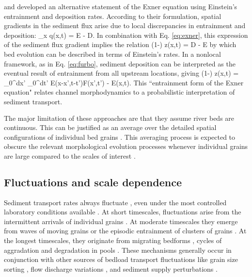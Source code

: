 \citet{Nakagawa1976} and \citet{Tsujimoto1978} developed an alternative statement of the Exner equation using Einstein's entrainment and deposition rates.
According to their formulation, spatial gradients in the sediment flux arise due to local discrepancies in entrainment and deposition:
\be \partial_x q(x,t) = E - D. \ee 
In combination with Eq. \ref{eq:exner}, this expression of the sediment flux gradient implies the relation
\be (1-\phi) \px z(x,t) = D - E\ee
by which bed evolution can be described in terms of Einstein's rates.
In a nonlocal framework, as in Eq. \ref{eq:furbo}, sediment deposition can be interpreted as the eventual result of entrainment from all upstream locations, giving
\be (1-\phi) \px z(x,t) = \int_0^\infty dx' \int_0^\infty dt' E(x-x',t-t')F(x',t') - E(x,t). \ee
This ``entrainment form of the Exner equation" \citep{Nakagawa1976, Parker2000, Furbish2017} relates channel morphodynamics to a probabilistic interpretation of sediment transport.

The major limitation of these approaches are that they assume river beds are continuous. This can be justified as an average over the detailed spatial configurations of individual bed grains \citep{Coleman2009}. This averaging process is expected to obscure the relevant morphological evolution processes whenever individual grains are large compared to the scales of interest \citep[e.g.][]{Shobe2021}.

\subsection{Fluctuations and scale dependence}

Sediment transport rates always fluctuate \citep{Kuhnle1988,Hoey1992,Recking2012}, even under the most controlled laboratory conditions available \citep{Ancey2006,Roseberry2012}.
At short timescales, fluctuations arise from the intermittent arrivals of individual grains \citep{Bohm2004,Ballio2018}. At moderate timescales they emerge from waves of moving grains \citep{Heyman2014} or the episodic entrainment of clusters of grains \citep{Strom2004,Papanicolaou2018}. At the longest timescales, they originate from migrating bedforms \citep{Guala2014}, cycles of aggradation and degradation in pools \citep{Dhont2018}.
These mechanisms generally occur in conjunction with other sources of bedload transport fluctuations like grain size sorting \citep{Iseya1987,Cudden2003}, flow discharge variations \citep{Wong2006,Mao2012,Redolfi2018}, and sediment supply perturbations \citep{Lisle1993,Madej2009,Elgueta-Astaburuaga2019}.

